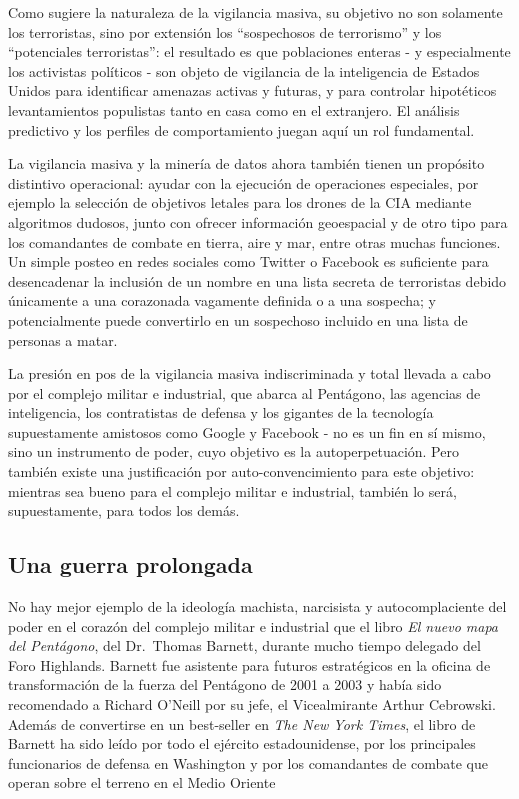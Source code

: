 \documentclass[10pt,a5paper,twoside,spanish,]{book}
\begin{document}
Como sugiere la naturaleza de la vigilancia masiva, su objetivo no son
solamente los terroristas, sino por extensión los ``sospechosos de
terrorismo'' y los ``potenciales terroristas'': el resultado es que
poblaciones enteras - y especialmente los activistas políticos - son
objeto de vigilancia de la inteligencia de Estados Unidos para
identificar amenazas activas y futuras, y para controlar hipotéticos
levantamientos populistas tanto en casa como en el extranjero. El
análisis predictivo y los perfiles de comportamiento juegan aquí un rol
fundamental.

La vigilancia masiva y la minería de datos ahora también tienen un
propósito distintivo operacional: ayudar con la ejecución de operaciones
especiales, por ejemplo la selección de objetivos letales para los
drones de la CIA mediante algoritmos dudosos, junto con ofrecer
información geoespacial y de otro tipo para los comandantes de combate
en tierra, aire y mar, entre otras muchas funciones. Un simple posteo en
redes sociales como Twitter o Facebook es suficiente para desencadenar
la inclusión de un nombre en una lista secreta de terroristas debido
únicamente a una corazonada vagamente definida o a una sospecha; y
potencialmente puede convertirlo en un sospechoso incluido en una lista
de personas a matar.

La presión en pos de la vigilancia masiva indiscriminada y total llevada
a cabo por el complejo militar e industrial, que abarca al Pentágono,
las agencias de inteligencia, los contratistas de defensa y los gigantes
de la tecnología supuestamente amistosos como Google y Facebook - no es
un fin en sí mismo, sino un instrumento de poder, cuyo objetivo es la
autoperpetuación. Pero también existe una justificación por
auto-convencimiento para este objetivo: mientras sea bueno para el
complejo militar e industrial, también lo será, supuestamente, para
todos los demás.

\subsection{Una guerra prolongada}\label{una-guerra-prolongada}

No hay mejor ejemplo de la ideología machista, narcisista y
autocomplaciente del poder en el corazón del complejo militar e
industrial que el libro \emph{El nuevo mapa del Pentágono}, del
Dr.~Thomas Barnett, durante mucho tiempo delegado del Foro Highlands.
Barnett fue asistente para futuros estratégicos en la oficina de
transformación de la fuerza del Pentágono de 2001 a 2003 y había sido
recomendado a Richard O'Neill por su jefe, el Vicealmirante Arthur
Cebrowski. Además de convertirse en un best-seller en \emph{The New York
Times}, el libro de Barnett ha sido leído por todo el ejército
estadounidense, por los principales funcionarios de defensa en
Washington y por los comandantes de combate que operan sobre el terreno
en el Medio Oriente
\end{document}
